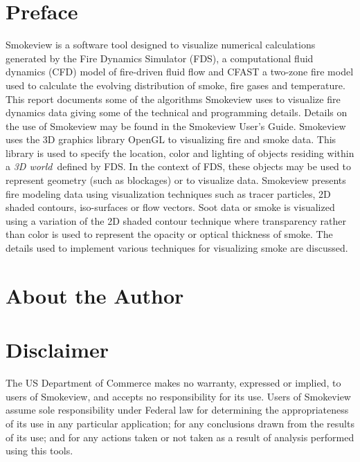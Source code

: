 \documentclass[11pt,twoside]{book}
\begin{document}
\chapter{Preface}
Smokeview is a software tool designed to visualize numerical
calculations generated by the Fire Dynamics Simulator (FDS), a
computational fluid dynamics (CFD) model of fire-driven fluid flow
and CFAST a two-zone fire model used to calculate the evolving
distribution of smoke, fire gases and temperature. This report
documents some of the algorithms Smokeview uses to visualize fire
dynamics data giving some of the technical and programming
details. Details on the use of Smokeview may be found in the
Smokeview User's Guide. Smokeview uses the 3D graphics library
OpenGL to visualizing fire and smoke data. This library is used to
specify the location, color and lighting of objects residing
within a {\em 3D world}\ defined by FDS. In the context of FDS,
these objects may be used to represent geometry (such as
blockages) or to visualize data. Smokeview presents fire modeling
data using visualization techniques such as tracer particles, 2D
shaded contours, iso-surfaces or flow vectors.  Soot data or smoke
is visualized using a variation of the 2D shaded contour technique
where transparency rather than color is used to represent the
opacity or optical thickness of smoke.  The details used to
implement various techniques for visualizing smoke are discussed.


\chapter{About the Author}

\begin{description}
\gforneybio
\end{description}

%
%

\chapter{Disclaimer}

The US Department of Commerce makes no warranty, expressed or
implied, to users of Smokeview, and accepts no responsibility for
its use. Users of Smokeview assume sole responsibility under
Federal law for determining the appropriateness of its use in any
particular application; for any conclusions drawn from the results
of its use; and for any actions taken or not taken as a result of
analysis performed using this tools.
\end{document}
